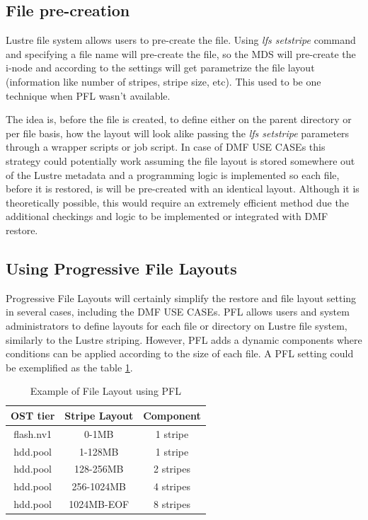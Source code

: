 \documentclass{article}
\begin{document}
\subsection{File pre-creation}
Lustre file system allows users to pre-create the file. Using \textit{lfs setstripe} command and specifying a file name will pre-create the file, so the MDS will pre-create the i-node and according to the settings will get parametrize the file layout (information like number of stripes, stripe size, etc). This used to be one technique when PFL wasn't available. 

The idea is, before the file is created, to define either on the parent directory or per file basis, how the layout will look alike passing the \textit{lfs setstripe} parameters through a wrapper scripts or job script. In case of DMF USE CASEs this strategy could potentially work assuming the file layout is stored somewhere out of the Lustre metadata and a programming logic is implemented so each file, before it is restored, is will be pre-created with an identical layout. Although it is theoretically possible, this would require an extremely efficient method due the additional checkings and logic to be implemented or integrated with DMF restore.

\subsection{Using Progressive File Layouts}
Progressive File Layouts will certainly simplify the restore and file layout setting in several cases, including the DMF USE CASEs. PFL allows users and system administrators to define layouts for each file or directory on Lustre file system, similarly to the Lustre striping. However, PFL adds a dynamic components where conditions can be applied according to the size of each file. A PFL setting could be exemplified as the table \ref{tab:Generic PFL Example}.

\begin{table}[h]
\centering
 \begin{tabular}{||c c c||} 
 \hline
 OST tier & Stripe Layout & Component \\ [0.5ex] 
 \hline\hline
 flash.nv1 & 0-1MB & 1 stripe \\ 
 \hline
 hdd.pool & 1-128MB & 1 stripe \\ 
 \hline
 hdd.pool & 128-256MB & 2 stripes\\
 \hline
  hdd.pool & 256-1024MB & 4 stripes\\
 \hline
   hdd.pool & 1024MB-EOF & 8 stripes\\
 \hline
 \end{tabular}
 \caption{Example of File Layout using PFL}
 \label{tab:Generic PFL Example}
\end{table}
\end{document}
